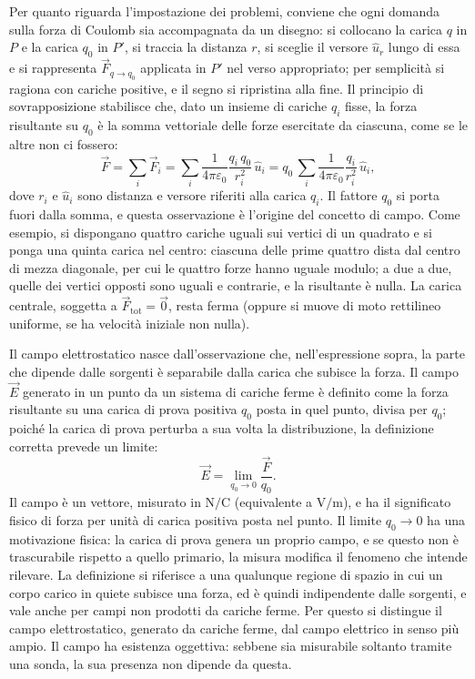 \documentclass[11pt,a4paper]{article}
\newcommand{\epz}{\varepsilon_0}
\newcommand{\Ev}{\vec{E}}
\newcommand{\Fv}{\vec{F}}
\newcommand{\uv}{\hat{u}}
\begin{document}
Per quanto riguarda l'impostazione dei problemi, conviene che ogni domanda sulla forza di Coulomb sia accompagnata da un disegno: si collocano la carica $q$ in $P$ e la carica $q_0$ in $P'$, si traccia la distanza $r$, si sceglie il versore $\uv_r$ lungo di essa e si rappresenta $\Fv_{q\to q_0}$ applicata in $P'$ nel verso appropriato; per semplicità si ragiona con cariche positive, e il segno si ripristina alla fine. Il principio di sovrapposizione stabilisce che, dato un insieme di cariche $q_i$ fisse, la forza risultante su $q_0$ è la somma vettoriale delle forze esercitate da ciascuna, come se le altre non ci fossero:
\[
\Fv=\sum_i \Fv_i=\sum_i \frac{1}{4\pi\epz}\frac{q_i\,q_0}{r_i^2}\,\uv_i=q_0\,\sum_i \frac{1}{4\pi\epz}\frac{q_i}{r_i^2}\,\uv_i ,
\]
dove $r_i$ e $\uv_i$ sono distanza e versore riferiti alla carica $q_i$. Il fattore $q_0$ si porta fuori dalla somma, e questa osservazione è l'origine del concetto di campo. Come esempio, si dispongano quattro cariche uguali sui vertici di un quadrato e si ponga una quinta carica nel centro: ciascuna delle prime quattro dista dal centro di mezza diagonale, per cui le quattro forze hanno uguale modulo; a due a due, quelle dei vertici opposti sono uguali e contrarie, e la risultante è nulla. La carica centrale, soggetta a $\Fv_{\mathrm{tot}}=\vec 0$, resta ferma (oppure si muove di moto rettilineo uniforme, se ha velocità iniziale non nulla).

Il campo elettrostatico nasce dall'osservazione che, nell'espressione sopra, la parte che dipende dalle sorgenti è separabile dalla carica che subisce la forza. Il campo $\Ev$ generato in un punto da un sistema di cariche ferme è definito come la forza risultante su una carica di prova positiva $q_0$ posta in quel punto, divisa per $q_0$; poiché la carica di prova perturba a sua volta la distribuzione, la definizione corretta prevede un limite:
\[
\Ev=\lim_{q_0\to 0}\frac{\Fv}{q_0}.
\]
Il campo è un vettore, misurato in $\ensuremath{\mathrm{N/C}}$ (equivalente a $\ensuremath{\mathrm{V/m}}$), e ha il significato fisico di forza per unità di carica positiva posta nel punto. Il limite $q_0\to 0$ ha una motivazione fisica: la carica di prova genera un proprio campo, e se questo non è trascurabile rispetto a quello primario, la misura modifica il fenomeno che intende rilevare. La definizione si riferisce a una qualunque regione di spazio in cui un corpo carico in quiete subisce una forza, ed è quindi indipendente dalle sorgenti, e vale anche per campi non prodotti da cariche ferme. Per questo si distingue il campo elettrostatico, generato da cariche ferme, dal campo elettrico in senso più ampio. Il campo ha esistenza oggettiva: sebbene sia misurabile soltanto tramite una sonda, la sua presenza non dipende da questa.
\end{document}
